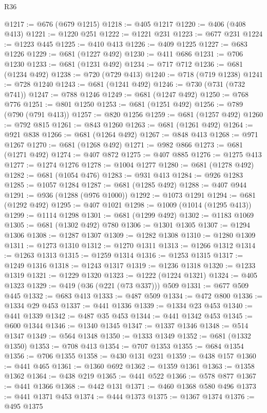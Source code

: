 \begin{lexlean}{R36}
\begin{coremodule}
@1217 := @676 (@679 @1215)
@1218 := @405 @1217
@1220 := @406 (@408 @413)
@1221 := @1220 @251
@1222 := @1221 @231
@1223 := @677 @231
@1224 := @1223 @445
@1225 := @410 @413
@1226 := @409 @1225
@1227 := @683 @1226
@1229 := @681 (@1227 @492)
@1230 := @411 @686
@1231 := @706 @1230
@1233 := @681 (@1231 @492)
@1234 := @717 @712
@1236 := @681 (@1234 @492)
@1238 := @720 (@729 @413)
@1240 := @718 (@719 @1238)
@1241 := @728 @1240
@1243 := @681 (@1241 @492)
@1246 := @730 (@731 (@732 @741))
@1247 := @788 @1246
@1249 := @681 (@1247 @492)
@1250 := @768 @776
@1251 := @801 @1250
@1253 := @681 (@1251 @492)
@1256 := @789 (@790 (@791 @413))
@1257 := @820 @1256
@1259 := @681 (@1257 @492)
@1260 := @792 @815
@1261 := @843 @1260
@1263 := @681 (@1261 @492)
@1264 := @921 @838
@1266 := @681 (@1264 @492)
@1267 := @848 @413
@1268 := @971 @1267
@1270 := @681 (@1268 @492)
@1271 := @982 @866
@1273 := @681 (@1271 @492)
@1274 := @407 @872
@1275 := @407 @885
@1276 := @1275 @413
@1277 := @1274 @1276
@1278 := @1004 @1277
@1280 := @681 (@1278 @492)
@1282 := @681 (@1054 @476)
@1283 := @931 @413
@1284 := @926 @1283
@1285 := @1057 @1284
@1287 := @681 (@1285 @492)
@1288 := @407 @944
@1291 := @936 (@1288 (@976 @1000))
@1292 := @1073 @1291
@1294 := @681 (@1292 @492)
@1295 := @407 @1021
@1298 := @1009 (@1014 (@1295 @413))
@1299 := @1114 @1298
@1301 := @681 (@1299 @492)
@1302 := @1183 @1069
@1305 := @681 (@1302 @492) @780
@1306 := @1301 @1305
@1307 := @1294 @1306
@1308 := @1287 @1307
@1309 := @1282 @1308
@1310 := @1280 @1309
@1311 := @1273 @1310
@1312 := @1270 @1311
@1313 := @1266 @1312
@1314 := @1263 @1313
@1315 := @1259 @1314
@1316 := @1253 @1315
@1317 := @1249 @1316
@1318 := @1243 @1317
@1319 := @1236 @1318
@1320 := @1233 @1319
@1321 := @1229 @1320
@1323 := @1222 (@1224 @1321)
@1324 := @405 @1323
@1329 := @419 (@36 (@221 (@73 @337))) @509
@1331 := @677 @509 @445
@1332 := @683 @413
@1333 := @487 @509
@1334 := @472 @800
@1336 := @1334 @29 @453
@1337 := @441 @1336
@1339 := @1334 @23 @453
@1340 := @441 @1339
@1342 := @487 @35 @453
@1344 := @441 @1342 @453
@1345 := @600 @1344
@1346 := @1340 @1345
@1347 := @1337 @1346
@1348 := @514 @1347
@1349 := @564 @1348
@1350 := @1333 @1349
@1352 := @681 (@1332 @1350)
@1353 := @708 @413
@1354 := @707 @1353
@1355 := @684 @1354
@1356 := @706 @1355
@1358 := @430 @131 @231
@1359 := @438 @157
@1360 := @441 @465
@1361 := @1360 @692
@1362 := @1359 @1361
@1363 := @1358 @1362
@1364 := @438 @219
@1365 := @441 @522
@1366 := @578 @877
@1367 := @441 @1366
@1368 := @442 @131
@1371 := @460 @1368 @580 @496
@1373 := @441 @1371 @453
@1374 := @444 @1373
@1375 := @1367 @1374
@1376 := @495 @1375

\end{coremodule}
\end{lexlean}

